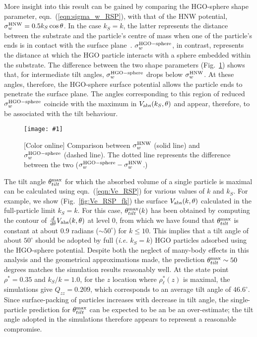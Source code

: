 \documentclass[aps,10pt,twocolumn]{revtex4}
\newlength{\picW}   %
\newcommand{\picA}{270} %
\newcommand{\picL}[1]{\texttt{[image: \#1]}}
\begin{document}
More insight into this result can be gained by comparing the HGO-sphere shape parameter,
eqn.~(\ref{eqn:sigma_w_RSP}), with that of the HNW potential, $\sigma^{\rm HNW}_w=0.5k_S\cos\theta$. In the case
$k_S=k$, the latter represents the distance between the substrate and the particle's centre of mass when one of
the particle's ends is in contact with the surface plane~\cite{BarmesCleaver04a}. $\sigma^{\rm HGO-sphere}_w$, in
contrast, represents the distance at which the HGO particle interacts with a sphere embedded within the substrate.
The difference between the two shape parameters (Fig.~\ref{fig:cmpHNW_RSP}) shows that, for intermediate tilt
angles, $\sigma^{\rm HGO-sphere}_w$ drops below $\sigma^{\rm HNW}_w$. At these angles, therefore, the HGO-sphere
surface potential allows the particle ends to penetrate the surface plane. The angles corresponding to this region
of reduced $\sigma^{\rm HGO-sphere}_w$ coincide with the maximum in $V_{\rm abs}(k_S,\theta)$ and appear,
therefore, to be associated with the tilt behaviour.

\begin{figure}
    \centering
    \picL{fig_06.ps}
    \caption{[Color online] Comparison between $\sigma^{\rm HNW}_w$ (solid line) and $\sigma^{\rm HGO-sphere}_w$ (dashed
    line). The dotted line represents the difference between the two
    ($\sigma^{\rm HGO-sphere}_w-\sigma^{\rm HNW}_w$.)}
    \label{fig:cmpHNW_RSP}
\end{figure}

The tilt angle $\theta^{\rm max}_{tilt}$ for which the absorbed volume of a single particle is maximal can be
calculated using eqn.~(\ref{eqn:Ve_RSP}) for various values of $k$ and $k_S$. For example, we show
(Fig.~\ref{fig:Ve_RSP_fk}) the surface $V_{\rm abs}(k,\theta)$ calculated in the full-particle limit $k_S=k$. For
this case, $\theta^{\rm max}_{tilt}(k)$ has been obtained by computing the contour of $\frac{d}{d\theta}V_{\rm
abs}(k,\theta)$ at level $0$, from which we have found that $\theta^{\rm max}_{tilt}$ is constant at about 0.9
radians ($\sim 50^\circ$) for $k\leq 10$. This implies that a tilt angle of about $50^\circ$ should be adopted by
full (\emph{i.e.} $k_S=k$) HGO particles adsorbed using the HGO-sphere potential. Despite both the neglect of
many-body effects in this analysis and the geometrical approximations made, the prediction $\theta^{\rm
max}_{tilt}\sim 50$ degrees matches the simulation results reasonably well. At the state point $\rho^{*} = 0.35$
and $k_S/k = 1.0$, for the $z$ location where $\rho^{*}_\ell(z)$ is maximal, the simulations give $Q_{zz} =
0.209$, which corresponds to an average tilt angle of $46.6^\circ$. Since surface-packing of particles increases
with decrease in tilt angle, the single-particle prediction for $\theta^{\rm max}_{tilt}$ can be expected to be an
be an over-estimate; the tilt angle adopted in the simulations therefore appears to represent a reasonable
compromise.
\end{document}
